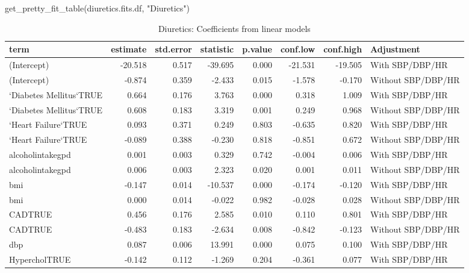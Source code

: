 \documentclass[
]{article}
\newenvironment{Shaded}{\begin{snugshade}}{\end{snugshade}}
\newcommand{\FunctionTok}[1]{\textcolor[rgb]{0.00,0.00,0.00}{#1}}
\newcommand{\NormalTok}[1]{#1}
\newcommand{\StringTok}[1]{\textcolor[rgb]{0.31,0.60,0.02}{#1}}
\begin{document}
\begin{Shaded}
\begin{Highlighting}[]
\FunctionTok{get\_pretty\_fit\_table}\NormalTok{(diuretics.fits.df, }\StringTok{"Diuretics"}\NormalTok{)}
\end{Highlighting}
\end{Shaded}

\begin{table}

\caption{\label{tab:diuretics-fit-table}Diuretics: Coefficients from linear models}
\centering
\begin{tabular}[t]{l|r|r|r|r|r|r|l}
\hline
term & estimate & std.error & statistic & p.value & conf.low & conf.high & Adjustment\\
\hline
(Intercept) & -20.518 & 0.517 & -39.695 & 0.000 & -21.531 & -19.505 & With SBP/DBP/HR\\
\hline
(Intercept) & -0.874 & 0.359 & -2.433 & 0.015 & -1.578 & -0.170 & Without SBP/DBP/HR\\
\hline
`Diabetes Mellitus`TRUE & 0.664 & 0.176 & 3.763 & 0.000 & 0.318 & 1.009 & With SBP/DBP/HR\\
\hline
`Diabetes Mellitus`TRUE & 0.608 & 0.183 & 3.319 & 0.001 & 0.249 & 0.968 & Without SBP/DBP/HR\\
\hline
`Heart Failure`TRUE & 0.093 & 0.371 & 0.249 & 0.803 & -0.635 & 0.820 & With SBP/DBP/HR\\
\hline
`Heart Failure`TRUE & -0.089 & 0.388 & -0.230 & 0.818 & -0.851 & 0.672 & Without SBP/DBP/HR\\
\hline
alcoholintakegpd & 0.001 & 0.003 & 0.329 & 0.742 & -0.004 & 0.006 & With SBP/DBP/HR\\
\hline
alcoholintakegpd & 0.006 & 0.003 & 2.323 & 0.020 & 0.001 & 0.011 & Without SBP/DBP/HR\\
\hline
bmi & -0.147 & 0.014 & -10.537 & 0.000 & -0.174 & -0.120 & With SBP/DBP/HR\\
\hline
bmi & 0.000 & 0.014 & -0.022 & 0.982 & -0.028 & 0.028 & Without SBP/DBP/HR\\
\hline
CADTRUE & 0.456 & 0.176 & 2.585 & 0.010 & 0.110 & 0.801 & With SBP/DBP/HR\\
\hline
CADTRUE & -0.483 & 0.183 & -2.634 & 0.008 & -0.842 & -0.123 & Without SBP/DBP/HR\\
\hline
dbp & 0.087 & 0.006 & 13.991 & 0.000 & 0.075 & 0.100 & With SBP/DBP/HR\\
\hline
HypercholTRUE & -0.142 & 0.112 & -1.269 & 0.204 & -0.361 & 0.077 & With SBP/DBP/HR\\

\end{tabular}
\end{table}
\end{document}
